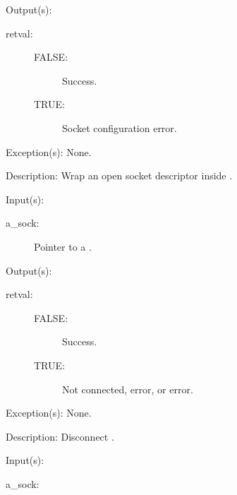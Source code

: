 \begin{capi}
\begin{capilist}
	\item[Output(s): ]
		\begin{description}\item[]
		\item[retval: ]
			\begin{description}\item[]
			\item[FALSE: ] Success.
			\item[TRUE: ] Socket configuration error.
			\end{description}
		\end{description}
	\item[Exception(s): ] None.
	\item[Description: ]
		Wrap an open socket descriptor inside .
	\end{capilist}
\label{sock_disconnect}
	\begin{capilist}
	\item[Input(s): ]
		\begin{description}\item[]
		\item[a\_sock: ]
			Pointer to a .
		\end{description}
	\item[Output(s): ]
		\begin{description}\item[]
		\item[retval: ]
			\begin{description}\item[]
			\item[FALSE: ]
				Success.
			\item[TRUE: ]
				Not connected,  error, or
				 error.
			\end{description}
		\end{description}
	\item[Exception(s): ] None.
	\item[Description: ]
		Disconnect .
	\end{capilist}
\label{sock_buffered_in}
	\begin{capilist}
	\item[Input(s): ]
		\begin{description}\item[]
		\item[a\_sock: ]

\end{description}
\end{capilist}
\end{capi}
